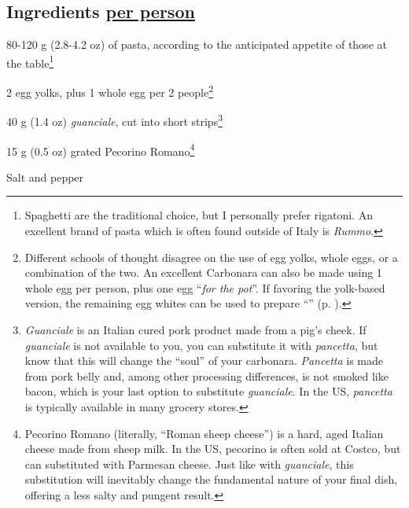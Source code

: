 \newpage
{}
\vspace*{-0.5 cm}

\subsection*{Ingredients \underline{per person}}
\begin{ingredients}
	\item 80-120 g (2.8-4.2 oz) of pasta, according to the anticipated appetite of those at the table\footnote{Spaghetti are the traditional choice, but I personally prefer rigatoni. An excellent brand of pasta which is often found outside of Italy is \textit{Rummo}.}
	\item 2 egg yolks, plus 1 whole egg per 2 people\footnote{Different schools of thought disagree on the use of egg yolks, whole eggs, or a combination of the two. An excellent Carbonara can also be made using 1 whole egg per person, plus one egg ``\textit{for the pot}''. If favoring the yolk-based version, the remaining egg whites can be used to prepare ``'' (p. \pageref{meringues}).}
	\item 40 g (1.4 oz) \textit{guanciale}, cut into short strips\footnote{\textit{Guanciale} is an Italian cured pork product made from a pig's cheek. If \textit{guanciale} is not available to you, you can substitute it with \textit{pancetta}, but know that this will change the ``soul'' of your carbonara. \textit{Pancetta} is made from pork belly and, among other processing differences, is not smoked like bacon, which is your last option to substitute \textit{guanciale}. In the US, \textit{pancetta} is typically available in many grocery stores.}
	\item 15 g (0.5 oz) grated Pecorino Romano\footnote{Pecorino Romano (literally, ``Roman sheep cheese'') is a hard, aged Italian cheese made from sheep milk. In the US, pecorino is often sold at Costco, but can substituted with Parmesan cheese. Just like with \textit{guanciale}, this substitution will inevitably change the fundamental nature of your final dish, offering a less salty and pungent result.}
	\item Salt and pepper
\end{ingredients}


\medskip

